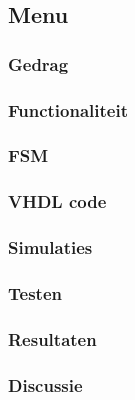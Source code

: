 \subsection{Menu}

\subsubsection{Gedrag}

\subsubsection{Functionaliteit}

\subsubsection{FSM}

\subsubsection{VHDL code}

\subsubsection{Simulaties}

\subsubsection{Testen}

\subsubsection{Resultaten}

\subsubsection{Discussie}
